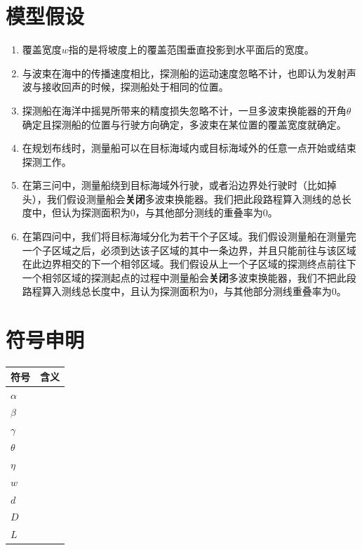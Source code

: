 \documentclass{article}
\begin{document}
\section{模型假设}
\begin{enumerate}
	\item 覆盖宽度$w$指的是将坡度上的覆盖范围垂直投影到水平面后的宽度。
	\item 与波束在海中的传播速度相比，探测船的运动速度忽略不计，也即认为发射声波与接收回声的时候，探测船处于相同的位置。
	\item 探测船在海洋中摇晃所带来的精度损失忽略不计，一旦多波束换能器的开角$\theta$确定且探测船的位置与行驶方向确定，多波束在某位置的覆盖宽度就确定。
	\item 在规划布线时，测量船可以在目标海域内或目标海域外的任意一点开始或结束探测工作。
	\item 在第三问中，测量船绕到目标海域外行驶，或者沿边界处行驶时（比如掉头），我们假设测量船会\textbf{关闭}多波束换能器。我们把此段路程算入测线的总长度中，但认为探测面积为0，与其他部分测线的重叠率为0。
	\item 在第四问中，我们将目标海域分化为若干个子区域。我们假设测量船在测量完一个子区域之后，必须到达该子区域的其中一条边界，并且只能前往与该区域在此边界相交的下一个相邻区域。我们假设从上一个子区域的探测终点前往下一个相邻区域的探测起点的过程中测量船会\textbf{关闭}多波束换能器，我们不把此段路程算入测线总长度中，且认为探测面积为0，与其他部分测线重叠率为0。
\end{enumerate}


\section{符号申明}

\begin{table}[H]
	\centering
	\begin{tabular}{ll}
	\hline
	符号	&  含义\\ 
	\hline
	$\alpha$	&  		\\
	$\beta$		&  		\\
	$\gamma$	&  		\\
	$\theta$			&  		\\ 
	$\eta$			&  		\\ 
	$w$			&  		\\
	$d$			&  		\\ 
	$D$			&  		\\ 
	$L$			&  		\\ 
	
	\hline
	\end{tabular}
\end{table}
\end{document}
